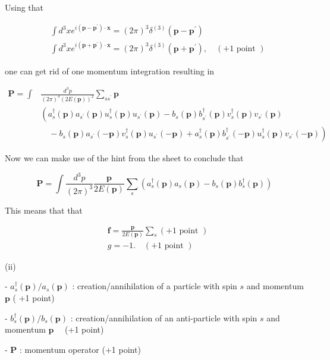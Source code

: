 \documentclass[10pt, letterpaper]{article}
\begin{document}
Using that

$$
\begin{aligned}
& \int d^3 x e^{i\left(\mathbf{p}-\mathbf{p}^{\prime}\right) \cdot \mathbf{x}}=(2 \pi)^3 \delta^{(3)}\left(\mathbf{p}-\mathbf{p}^{\prime}\right) \\
& \int d^3 x e^{i\left(\mathbf{p}+\mathbf{p}^{\prime}\right) \cdot \mathbf{x}}=(2 \pi)^3 \delta^{(3)}\left(\mathbf{p}+\mathbf{p}^{\prime}\right), \quad(+1 \text { point })
\end{aligned}
$$

one can get rid of one momentum integration resulting in

$$
\begin{aligned}
\mathbf{P}=\int & \frac{d^3 p}{(2 \pi)^3(2 E(\mathbf{p}))^2} \sum_{s s^{\prime}} \mathbf{p} \\
& \left(a_s^{\dagger}(\mathbf{p}) a_{s^{\prime}}(\mathbf{p}) u_s^{\dagger}(\mathbf{p}) u_{s^{\prime}}(\mathbf{p})-b_s(\mathbf{p}) b_{s^{\prime}}^{\dagger}(\mathbf{p}) v_s^{\dagger}(\mathbf{p}) v_{s^{\prime}}(\mathbf{p})\right. \\
& \left.\quad-b_s(\mathbf{p}) a_{s^{\prime}}(-\mathbf{p}) v_s^{\dagger}(\mathbf{p}) u_{s^{\prime}}(-\mathbf{p})+a_s^{\dagger}(\mathbf{p}) b_{s^{\prime}}^{\dagger}(-\mathbf{p}) u_s^{\dagger}(\mathbf{p}) v_{s^{\prime}}(-\mathbf{p})\right)
\end{aligned}
$$


Now we can make use of the hint from the sheet to conclude that

$$
\mathbf{P}=\int \frac{d^3 p}{(2 \pi)^3} \frac{\mathbf{p}}{2 E(\mathbf{p})} \sum_s\left(a_s^{\dagger}(\mathbf{p}) a_s(\mathbf{p})-b_s(\mathbf{p}) b_s^{\dagger}(\mathbf{p})\right)
$$


This means that that

$$
\begin{aligned}
& \mathbf{f}=\frac{\mathbf{p}}{2 E(\mathbf{p})} \sum_s(+1 \text { point }) \\
& g=-1 . \quad(+1 \text { point })
\end{aligned}
$$

(ii) 

- $a_s^{\dagger}(\mathbf{p}) / a_s(\mathbf{p})$ : creation/annihilation of a particle with spin $s$ and momentum $\mathbf{p}$ ( +1 point)

- $b_s^{\dagger}(\mathbf{p}) / b_s(\mathbf{p})$ : creation/annihilation of an anti-particle with spin $s$ and momentum $\mathbf{p} \quad$ (+1 point)

- $\mathbf{P}$ : momentum operator (+1 point)
\end{document}
